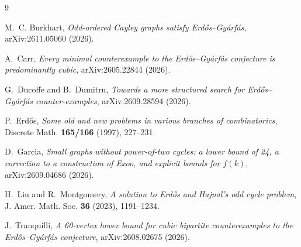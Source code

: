 \documentclass[11pt]{amsart}
\theoremstyle{definition}
\theoremstyle{remark}
\begin{document}
\begin{thebibliography}{9}

M.~C. Burkhart, \emph{Odd-ordered Cayley graphs satisfy Erd\H{o}s--Gy\'arf\'as}, arXiv:2611.05060 (2026).

A.~Carr, \emph{Every minimal counterexample to the Erd\H{o}s--Gy\'arf\'as conjecture is predominantly cubic}, arXiv:2605.22844 (2026).

G.~Ducoffe and B.~Dumitru, \emph{Towards a more structured search for Erd\H{o}s--Gy\'arf\'as counter-examples}, arXiv:2609.28594 (2026).

P.~Erd\H{o}s, \emph{Some old and new problems in various branches of combinatorics}, Discrete Math. \textbf{165/166} (1997), 227--231.

D.~Garcia, \emph{Small graphs without power-of-two cycles: a lower bound of 24, a correction to a construction of Exoo, and explicit bounds for $f(k)$}, arXiv:2609.04686 (2026).

H.~Liu and R.~Montgomery, \emph{A solution to Erd\H{o}s and Hajnal's odd cycle problem}, J. Amer. Math. Soc. \textbf{36} (2023), 1191--1234.

J.~Tranquilli, \emph{A 60-vertex lower bound for cubic bipartite counterexamples to the Erd\H{o}s--Gy\'arf\'as conjecture}, arXiv:2608.02675 (2026).

\end{thebibliography}
\end{document}
